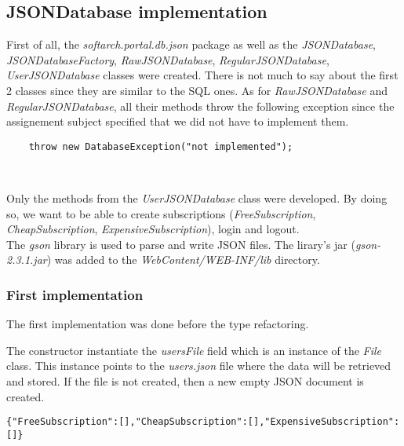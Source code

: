 \subsection{JSONDatabase implementation}

First of all, the \emph{softarch.portal.db.json} package as well as the
\emph{JSONDatabase}, \emph{JSONDatabaseFactory}, \emph{RawJSONDatabase},
\emph{RegularJSONDatabase}, \emph{UserJSONDatabase} classes were
created. There is not much to say about the first 2 classes since they
are similar to the SQL ones. As for \emph{RawJSONDatabase} and
\emph{RegularJSONDatabase}, all their methods throw the following exception
since the assignement subject specified that we did not have to implement them.\\

\begin{lstlisting}
    throw new DatabaseException("not implemented");
\end{lstlisting}
\

Only the methods from the \emph{UserJSONDatabase} class were developed.
By doing so, we want to be able to create subscriptions
(\emph{FreeSubscription}, \emph{CheapSubscription},
\emph{ExpensiveSubscription}), login and logout.\\

The \emph{gson} library is used to parse and write JSON files. The lirary's jar
(\emph{gson-2.3.1.jar}) was added to the \emph{WebContent/WEB-INF/lib}
directory.

\subsubsection{First implementation}

\begin{framewarning}
The first implementation was done before the type refactoring.
\end{framewarning}

The constructor instantiate the \emph{usersFile} field which is an
instance of the \emph{File} class. This instance points to the
\emph{users.json} file where the data will be retrieved and stored. If
the file is not created, then a new empty JSON document is created.\\

\begin{lstlisting}[caption={empty users.json document}]
{"FreeSubscription":[],"CheapSubscription":[],"ExpensiveSubscription":[]}
\end{lstlisting}
\

